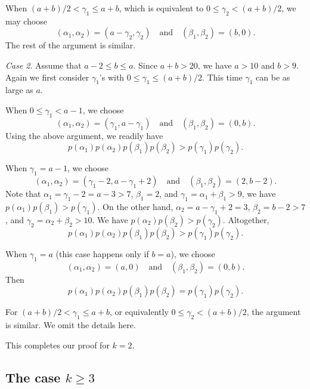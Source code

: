 \documentclass[12pt,reqno]{amsart}
\numberwithin{equation}{section}
\theoremstyle{plain}
\theoremstyle{definition}
\begin{document}
When $(a+b)/2< \gamma_1\le a+b$, which is equivalent to $0\le \gamma_2< (a+b)/2$, we may choose
$$(\alpha_1,\alpha_2)=(a-\gamma_2,\gamma_2)\quad \text{and} \quad (\beta_1,\beta_2)=(b,0).$$
The rest of the argument is similar.

\textit{Case 2}. Assume that $a-2\le b\le a$. Since $a+b>20$, we have $a>10$ and $b>9$. Again we first consider $\gamma_1$'s with $0\le \gamma_1\le (a+b)/2$. This time $\gamma_1$ can be as large as $a$.

When $0\le \gamma_1<a-1$, we choose
$$(\alpha_1,\alpha_2)=(\gamma_1,a-\gamma_1)\quad \text{and} \quad (\beta_1,\beta_2)=(0,b).$$
Using the above argument, we readily have
$$p(\alpha_{1})p(\alpha_{2})p(\beta_{1})p(\beta_{2})> p(\gamma_{1})p(\gamma_{2}).$$

When $\gamma_1=a-1$, we choose
$$(\alpha_1,\alpha_2)=(\gamma_1-2,a-\gamma_1+2)\quad \text{and} \quad (\beta_1,\beta_2)=(2,b-2).$$
Note that $\alpha_1=\gamma_1-2=a-3>7$, $\beta_1=2$, and $\gamma_1=\alpha_1+\beta_1>9$, we have $p(\alpha_1)p(\beta_1)>p(\gamma_1)$. On the other hand, $\alpha_2=a-\gamma_1+2=3$, $\beta_2=b-2>7$, and $\gamma_2=\alpha_2+\beta_2>10$. We have $p(\alpha_2)p(\beta_2)>p(\gamma_2)$. Altogether,
$$p(\alpha_{1})p(\alpha_{2})p(\beta_{1})p(\beta_{2})> p(\gamma_{1})p(\gamma_{2}).$$

When $\gamma_1=a$ (this case happens only if $b=a$), we choose
$$(\alpha_1,\alpha_2)=(a,0)\quad \text{and} \quad (\beta_1,\beta_2)=(0,b).$$
Then
$$p(\alpha_{1})p(\alpha_{2})p(\beta_{1})p(\beta_{2})= p(\gamma_{1})p(\gamma_{2}).$$

For $(a+b)/2< \gamma_1\le a+b$, or equivalently $0\le \gamma_2< (a+b)/2$, the argument is similar. We omit the details here.

This completes our proof for $k=2$.


\subsection{The case $k\geq3$}
\end{document}
